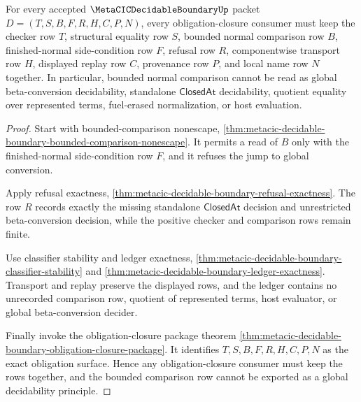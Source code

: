 \begin{theorem}
\label{thm:metacic-decidable-boundary-obligation-scope-lock}
For every accepted $\MetaCICDecidableBoundaryUp$ packet $D=(T,S,B,F,R,H,C,P,N)$, every obligation-closure consumer must keep the checker row $T$, structural equality row $S$, bounded normal comparison row $B$, finished-normal side-condition row $F$, refusal row $R$, componentwise transport row $H$, displayed replay row $C$, provenance row $P$, and local name row $N$ together. In particular, bounded normal comparison cannot be read as global beta-conversion decidability, standalone $\mathsf{ClosedAt}$ decidability, quotient equality over represented terms, fuel-erased normalization, or host evaluation.
\end{theorem}
\begin{proof}
Start with bounded-comparison nonescape, \autoref{thm:metacic-decidable-boundary-bounded-comparison-nonescape}. It permits a read of $B$ only with the finished-normal side-condition row $F$, and it refuses the jump to global conversion.

Apply refusal exactness, \autoref{thm:metacic-decidable-boundary-refusal-exactness}. The row $R$ records exactly the missing standalone $\mathsf{ClosedAt}$ decision and unrestricted beta-conversion decision, while the positive checker and comparison rows remain finite.

Use classifier stability and ledger exactness, \autoref{thm:metacic-decidable-boundary-classifier-stability} and \autoref{thm:metacic-decidable-boundary-ledger-exactness}. Transport and replay preserve the displayed rows, and the ledger contains no unrecorded comparison row, quotient of represented terms, host evaluator, or global beta-conversion decider.

Finally invoke the obligation-closure package theorem \autoref{thm:metacic-decidable-boundary-obligation-closure-package}. It identifies $T,S,B,F,R,H,C,P,N$ as the exact obligation surface. Hence any obligation-closure consumer must keep the rows together, and the bounded comparison row cannot be exported as a global decidability principle.
\end{proof}

